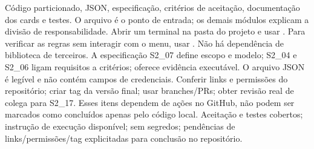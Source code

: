
 Código particionado, JSON, especificação, critérios de aceitação, documentação dos cards e testes. O arquivo  é o ponto de entrada; os demais módulos explicam a divisão de responsabilidade.
 Abrir um terminal na pasta do projeto e usar . Para verificar as regras sem interagir com o menu, usar . Não há dependência de biblioteca de terceiros.
 A especificação S2\_07 define escopo e modelo; S2\_04 e S2\_06 ligam requisitos a critérios;  oferece evidência executável. O arquivo JSON é legível e não contém campos de credenciais.
 Conferir links e permissões do repositório; criar tag da versão final; usar branches/PRs; obter revisão real de colega para S2\_17. Esses itens dependem de ações no GitHub, não podem ser marcados como concluídos apenas pelo código local.
 Aceitação e testes cobertos; instrução de execução disponível; sem segredos; pendências de links/permissões/tag explicitadas para conclusão no repositório.

